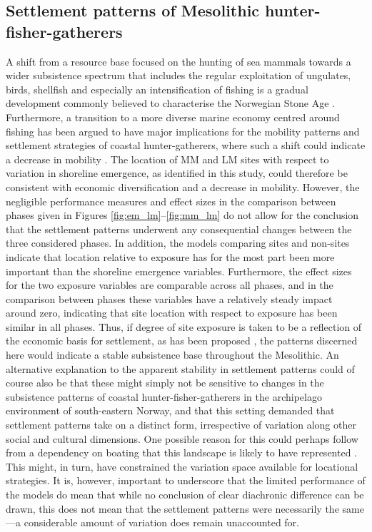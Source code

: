 \documentclass[12pt, a4paper]{article}
\begin{document}
\subsection{Settlement patterns of Mesolithic hunter-fisher-gatherers}
A shift from a resource base focused on the hunting of sea mammals towards a wider subsistence spectrum that includes the regular exploitation of ungulates, birds, shellfish and especially an intensification of fishing is a gradual development commonly believed to characterise the Norwegian Stone Age \citep[][]{breivik2014, bjerck2016, ritchie2016, jorgensen2020, mjaerum2020}. Furthermore, a transition to a more diverse marine economy centred around fishing has been argued to have major implications for the mobility patterns and settlement strategies of coastal hunter-gatherers, where such a shift could indicate a decrease in mobility \citep[see above and][]{boethius2017, boethius2018}. The location of MM and LM sites with respect to variation in shoreline emergence, as identified in this study, could therefore be consistent with economic diversification and a decrease in mobility. However, the negligible performance measures and effect sizes in the comparison between phases given in Figures \ref{fig:em_lm}--\ref{fig:mm_lm} do not allow for the conclusion that the settlement patterns underwent any consequential changes between the three considered phases. In addition, the models comparing sites and non-sites indicate that location relative to exposure has for the most part been more important than the shoreline emergence variables. Furthermore, the effect sizes for the two exposure variables are comparable across all phases, and in the comparison between phases these variables have a relatively steady impact around zero, indicating that site location with respect to exposure has been similar in all phases. Thus, if degree of site exposure is taken to be a reflection of the economic basis for settlement, as has been proposed \citep[e.g.][]{bjerck2009, breivik2014}, the patterns discerned here would indicate a stable subsistence base throughout the Mesolithic. An alternative explanation to the apparent stability in settlement patterns could of course also be that these might simply not be sensitive to changes in the subsistence patterns of coastal hunter-fisher-gatherers in the archipelago environment of south-eastern Norway, and that this setting demanded that settlement patterns take on a distinct form, irrespective of variation along other social and cultural dimensions. One possible reason for this could perhaps follow from a dependency on boating that this landscape is likely to have represented \citep[e.g.][]{bjerck2008, glorstad2013}. This might, in turn, have constrained the variation space available for locational strategies. It is, however, important to underscore that the limited performance of the models do mean that while no conclusion of clear diachronic difference can be drawn, this does not mean that the settlement patterns were necessarily the same---a considerable amount of variation does remain unaccounted for.
\end{document}
